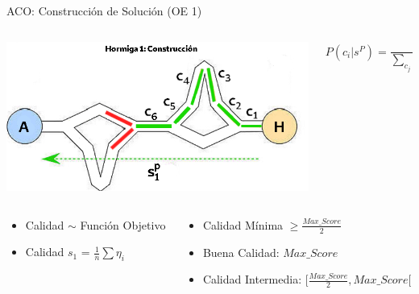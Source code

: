 \begin{frame}{ACO: Construcci\'on de Soluci\'on (OE 1)}
    \begin{columns}
        \begin{column}{0.65\textwidth}
            \centering
            \includegraphics[scale=0.4]{Pictures/ACO-ant-Constr-choices.png}
        \end{column}
        \begin{column}{0.35\textwidth}
        \small
            \begin{equation}
            P(c_{i} | s^{P}) = \frac
            {\tau_{i} ~ \eta_{i}}
            {\sum\limits_{c_{j}\in N(s^p)}{\tau_{j} ~ \eta_{j} } } %
            \label{eq:antProbabilities}
            \end{equation}
        \end{column}
    \end{columns}

    \begin{columns}
        \begin{column}{0.35\textwidth}
            \begin{itemize}
                \item Calidad $\sim$ Funci\'on Objetivo 
                \item Calidad $s_1$ = $\frac{1}{n}\sum \eta_{i} $
            \end{itemize}
        \end{column}
        \begin{column}{0.65\textwidth}
            \begin{itemize}%
                \item Calidad M\'inima $\geq \frac{Max\_Score}{2}$
                \item Buena Calidad: $Max\_Score$
                \item Calidad Intermedia: $[\frac{Max\_Score}{2}, Max\_Score[$
            \end{itemize}
        \end{column}
    \end{columns}
\end{frame}


